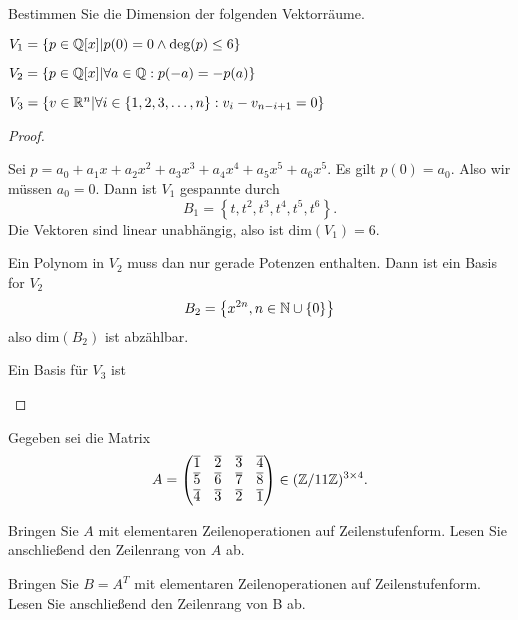 \begin{Problem}
Bestimmen Sie die Dimension der folgenden Vektorräume.	
\begin{parts}
	\item $V_1=\left\{ p\in \mathbb{Q}[x]|p(0)=0\wedge \text{deg}(p)\le 6 \right\} $ 
	\item $V_2=\left\{ p\in \mathbb{Q}[x]|\forall a\in \mathbb{Q}:p(-a)=-p(a) \right\} $ 
	\item $V_3=\left\{ v\in \mathbb{R}^n|\forall i\in \left\{ 1,2,3,\dots, n \right\} :v_i-v_{n-i+1}=0 \right\} $
\end{parts}
\end{Problem}
\begin{proof}
	\begin{parts}
	\item Sei $p=a_0+a_1x+a_2x^2+a_3x^3+a_4x^4+a_5x^5+a_6x^5$. Es gilt $p(0)=a_0$. Also wir müssen $a_0=0$. Dann ist $V_1$ gespannte durch
		\[
		B_1=\left\{ t,t^2,t^3,t^4,t^5,t^6 \right\} 
	.\]
	Die Vektoren sind linear unabhängig, also ist $\text{dim}(V_1)=6$.
\item Ein Polynom in $V_2$ muss dan nur gerade Potenzen enthalten. Dann ist ein Basis for $V_2$ 
	\[
		B_2=\left\{ x^{2n}, n\in \mathbb{N}\cup \left\{ 0 \right\}  \right\} 
	\]
	also $\text{dim}(B_2)$ ist abzählbar.
\item Ein Basis f\"{u}r $V_3$ ist
	\end{parts}
\end{proof}
\begin{Problem}
	Gegeben sei die Matrix
	\[
		A=\begin{pmatrix} \overline{1} & \overline{2} & \overline{3} & \overline{4}\\ \overline{5} & \overline{6} & \overline{7} & \overline{8} \\ \overline{4}& \overline{3} & \overline{2} & \overline{1} \end{pmatrix} \in (\mathbb{Z} / 11\mathbb{Z})^{3\times 4}
	.\] 
	\begin{parts}
	\item Bringen Sie $A$ mit elementaren Zeilenoperationen auf Zeilenstufenform. Lesen Sie anschließend den Zeilenrang von $A$ ab.  
	\item Bringen Sie $B=A^T$ mit elementaren Zeilenoperationen auf Zeilenstufenform. Lesen Sie anschließend den Zeilenrang von B ab. 
	  \end{parts}
\end{Problem}
